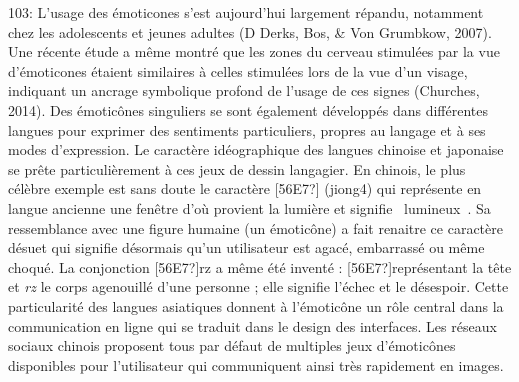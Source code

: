 103: L{\textquoteright}usage des \'emoticones s{\textquoteright}est aujourd{\textquoteright}hui largement r\'epandu, notamment chez les adolescents et jeunes adultes (D Derks, Bos, \& Von Grumbkow, 2007). Une r\'ecente \'etude a m\^eme montr\'e que les zones du cerveau stimul\'ees par la vue d{\textquoteright}\'emoticones \'etaient similaires \`a celles stimul\'ees lors de la vue d{\textquoteright}un visage, indiquant un ancrage symbolique profond de l{\textquoteright}usage de ces signes (Churches, 2014). Des \'emotic\^ones singuliers se sont \'egalement d\'evelopp\'es dans diff\'erentes langues pour exprimer des sentiments particuliers, propres au langage et \`a ses modes d{\textquoteright}expression. Le caract\`ere id\'eographique des langues chinoise et japonaise se pr\^ete particuli\`erement \`a ces jeux de dessin langagier. En chinois, le plus c\'el\`ebre exemple est sans doute le caract\`ere [56E7?] (jiong4) qui repr\'esente en langue ancienne une fen\^etre d{\textquoteright}o\`u provient la lumi\`ere et signifie {\guillemotleft}~lumineux~{\guillemotright}. Sa ressemblance avec une figure humaine (un \'emotic\^one) a fait renaitre ce caract\`ere d\'esuet qui signifie d\'esormais qu{\textquoteright}un utilisateur est agac\'e, embarrass\'e ou m\^eme choqu\'e. La conjonction {\textquotedbl}[56E7?]rz{\textquotedbl} a m\^eme \'et\'e invent\'e : [56E7?]repr\'esentant la t\^ete et \textit{rz} le corps agenouill\'e d{\textquoteright}une personne ; elle signifie l{\textquoteright}\'echec et le d\'esespoir. Cette particularit\'e des langues asiatiques donnent \`a l{\textquoteright}\'emotic\^one un r\^ole central dans la communication en ligne qui se traduit dans le design des interfaces. Les r\'eseaux sociaux chinois proposent tous par d\'efaut de multiples jeux d{\textquoteright}\'emotic\^ones disponibles pour l{\textquoteright}utilisateur qui communiquent ainsi tr\`es rapidement en images.  

